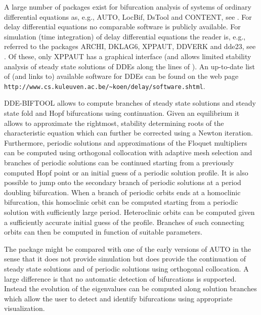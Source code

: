 \documentclass[10pt]{article}
\gdef \DDEBIFCODE{{\scshape DDE-BIFTOOL}}
\begin{document}
A large number of packages exist for bifurcation analysis
of systems of ordinary differential equations
as, e.g., AUTO, LocBif, DsTool and CONTENT, see
\cite{Doed99,Khib92,Back92,Kuzn97}. For delay differential equations
no comparable
software is publicly available.
For simulation (time integration) of delay differential equations  
the reader is, e.g., referred to the 
packages ARCHI, DKLAG6, XPPAUT, DDVERK and dde23, 
see \cite{Paul95,Thom97,Erme98,Enri97,Sham00}. 
Of these, only XPPAUT has a graphical interface (and allows limited
stability analysis of steady state solutions of DDEs
along the lines of \cite{Luzy96}). An up-to-date list of (and links to)
available software for DDEs can be found on the
web page \verb#http://www.cs.kuleuven.ac.be/~koen/delay/software.shtml#.

{\DDEBIFCODE} allows to compute branches
of steady state solutions and
steady state fold and Hopf bifurcations using continuation.
Given an equilibrium it allows to approximate 
the rightmost, stability determining
roots of the characteristic equation
which can further be corrected using a Newton iteration.
Furthermore, periodic solutions and approximations of the 
Floquet multipliers  
can be computed 
using orthogonal collocation with adaptive mesh selection and
branches of periodic solutions can be continued starting from
a previously computed Hopf point or an initial guess of a periodic
solution profile.
It is also possible to jump onto the secondary branch of periodic solutions
at a period doubling bifurcation.
When a branch of periodic orbits ends at a homoclinic bifurcation, this
homoclinic orbit can be computed starting from a periodic solution 
with sufficiently large
period.  Heteroclinic orbits can be computed given a
sufficiently accurate initial guess of the profile. Branches of such 
connecting orbits
can then be computed in function of suitable parameters.

The package might 
be compared with one of the early versions of AUTO in the sense that 
it does
not provide simulation but does provide the continuation of
steady state solutions and of periodic solutions using orthogonal
collocation.
A large difference is that no automatic detection
of bifurcations is supported. Instead the evolution of the
eigenvalues can be computed along solution branches 
which allow the user to detect and identify 
bifurcations using appropriate visualization.
\end{document}
